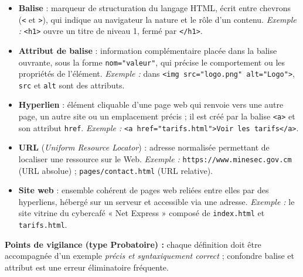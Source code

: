\documentclass[11pt]{article}
\newcommand{\cle}[1]{{\popxbold\color{popdark}#1}}
\begin{document}
\begin{corrige}
\begin{itemize}
\item \textbf{\cle{Balise}} : marqueur de structuration du langage HTML, écrit entre chevrons (\texttt{<} et \texttt{>}), qui indique au navigateur la nature et le rôle d'un contenu. \emph{Exemple :} \texttt{<h1>} ouvre un titre de niveau 1, fermé par \texttt{</h1>}.
\item \textbf{\cle{Attribut de balise}} : information complémentaire placée dans la balise ouvrante, sous la forme \texttt{nom="valeur"}, qui précise le comportement ou les propriétés de l'élément. \emph{Exemple :} dans \texttt{<img src="logo.png" alt="Logo">}, \texttt{src} et \texttt{alt} sont des attributs.
\item \textbf{\cle{Hyperlien}} : élément cliquable d'une page web qui renvoie vers une autre page, un autre site ou un emplacement précis ; il est créé par la balise \texttt{<a>} et son attribut \texttt{href}. \emph{Exemple :} \texttt{<a href="tarifs.html">Voir les tarifs</a>}.
\item \textbf{\cle{URL}} (\emph{Uniform Resource Locator}) : adresse normalisée permettant de localiser une ressource sur le Web. \emph{Exemple :} \texttt{https://www.minesec.gov.cm} (URL absolue) ; \texttt{pages/contact.html} (URL relative).
\item \textbf{\cle{Site web}} : ensemble cohérent de pages web reliées entre elles par des hyperliens, hébergé sur un serveur et accessible via une adresse. \emph{Exemple :} le site vitrine du cybercafé « Net Express » composé de \texttt{index.html} et \texttt{tarifs.html}.
\end{itemize}
\textbf{Points de vigilance (type Probatoire) :} chaque définition doit être accompagnée d'un exemple \emph{précis et syntaxiquement correct} ; confondre balise et attribut est une erreur éliminatoire fréquente.
\end{corrige}
\end{document}
